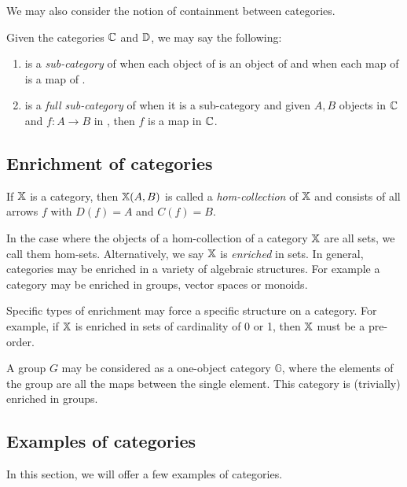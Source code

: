 We may also consider the notion of containment between categories.

\begin{definition}\label{def:subcategories}
  Given the categories $\mathbb{C}$ and $\mathbb{D}$, we may say the following:
  \begin{enumerate}[{(}i{)}]
    \item \C is a \emph{sub-category} of \D when each object of \C is an object of \D and when each map
    of \C is a map of \D.
    \item \C is a \emph{full sub-category} of \D when it is a sub-category and given $A, B$ objects
      in $\mathbb{C}$ and $f:A \to B$ in \D, then $f$ is a map in $\mathbb{C}$.
  \end{enumerate}
\end{definition}

\subsection{Enrichment of categories} %
\label{sub:enrichement_of_categories}
\begin{definition}\label{def:hom-collection}
  If $\mathbb{X}$ is a category, then $\mathbb{X}(A,B)$ is called a \emph{hom-collection} of $\mathbb{X}$ and consists
  of all arrows $f$ with $D(f) = A$ and $C(f) = B$.
\end{definition}

In the case where the objects of a hom-collection of a category $\mathbb{X}$ are all sets, we call them
hom-sets. Alternatively, we say $\mathbb{X}$ is \emph{enriched} in sets. In general, categories may be enriched in a
variety of algebraic structures. For example a category may be enriched in groups, vector spaces or
monoids.

Specific types of enrichment may force a specific structure on a category. For example, if $\mathbb{X}$ is
enriched in sets of cardinality of 0 or 1, then $\mathbb{X}$ must be a pre-order.

\begin{example}
  A group $G$ may be considered as a one-object category $\mathbb{G}$, where the elements of the
  group are all the  maps between the single element. This category is (trivially) enriched in groups.
\end{example}
\subsection{Examples of categories} %
\label{sub:examples_of_categories}
In this section, we will offer a few examples of categories.

